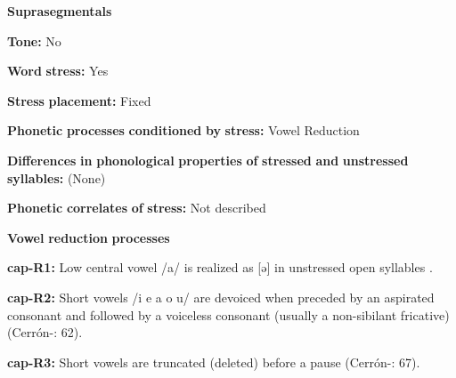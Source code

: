 \begin{styleBody}
\textbf{Suprasegmentals}
\end{styleBody}

\begin{styleBody}
\textbf{Tone:} No
\end{styleBody}

\begin{styleBody}
\textbf{Word} \textbf{stress:} Yes
\end{styleBody}

\begin{styleBody}
\textbf{Stress} \textbf{placement:} Fixed
\end{styleBody}

\begin{styleBody}
\textbf{Phonetic} \textbf{processes} \textbf{conditioned} \textbf{by} \textbf{stress:} Vowel Reduction
\end{styleBody}

\begin{styleBody}
\textbf{Differences} \textbf{in} \textbf{phonological} \textbf{properties} \textbf{of} \textbf{stressed} \textbf{and} \textbf{unstressed} \textbf{syllables:} (None)
\end{styleBody}

\begin{styleBody}
\textbf{Phonetic} \textbf{correlates} \textbf{of} \textbf{stress:} Not described
\end{styleBody}

\begin{styleBody}
\textbf{Vowel} \textbf{reduction} \textbf{processes}
\end{styleBody}

\begin{styleBody}
\textbf{cap-R1:} Low central vowel /a/ is realized as [ə] in unstressed open syllables \citep[301]{Olson1967}.
\end{styleBody}

\begin{styleBody}
\textbf{cap-R2:} Short vowels /i e a o u/ are devoiced when preceded by an aspirated consonant and followed by a voiceless consonant (usually a non-sibilant fricative) (Cerrón-\citealt{Palomino2006}: 62).
\end{styleBody}

\begin{styleBody}
\textbf{cap-R3:} Short vowels are truncated (deleted) before a pause (Cerrón-\citealt{Palomino2006}: 67).
\end{styleBody}

